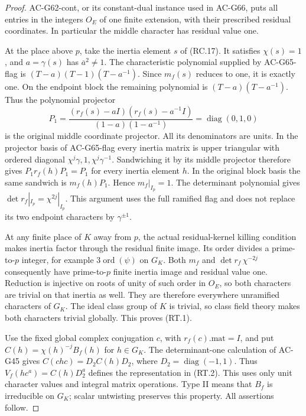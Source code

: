 \begin{proof}
AC-G62-cont, or its constant-dual instance used in AC-G66,
puts all entries in the integers \(O_E\) of one finite
extension, with their prescribed residual coordinates.
In particular the middle character has residual value one.

At the place above \(p\), take the inertia element \(s\)
of (RC.17). It satisfies \(\chi(s)=1\), and
\(a=\gamma(s)\) has \(\overline a^2\ne1\).
The characteristic polynomial supplied by AC-G65-flag is
\((T-a)(T-1)(T-a^{-1})\). Since \(m_f(s)\) reduces to
one, it is exactly one. On the endpoint block the remaining
polynomial is \((T-a)(T-a^{-1})\). Thus the polynomial
projector
\[
 P_1=\frac{(r_f(s)-aI)(r_f(s)-a^{-1}I)}
                 {(1-a)(1-a^{-1})}
             =\operatorname{diag}(0,1,0)
                                                        \tag{RT.3}
\]
is the original middle coordinate projector. All its
denominators are units. In the projector basis of
AC-G65-flag every inertia matrix is upper triangular with
ordered diagonal \(\chi^j\gamma,1,\chi^j\gamma^{-1}\).
Sandwiching it by its middle projector therefore gives
\(P_1r_f(h)P_1=P_1\) for every inertia element \(h\).
In the original block basis the same sandwich is
\(m_f(h)P_1\). Hence \(m_f|_{I_p}=1\).
The determinant polynomial gives
\(\det r_f|_{I_p}=\chi^{2j}|_{I_p}\).
This argument uses the full ramified flag and does not
replace its two endpoint characters by \(\gamma^{\pm1}\).

At any finite place of \(K\) away from \(p\), the actual
residual-kernel killing condition makes inertia factor
through the residual finite image. Its order divides a
prime-to-\(p\) integer, for example
\(3\operatorname{ord}(\psi)\) on \(G_K\).
Both \(m_f\) and \(\det r_f\,\chi^{-2j}\) consequently
have prime-to-\(p\) finite inertia image and residual
value one. Reduction is injective on roots of unity of
such order in \(O_E\), so both characters are trivial
on that inertia as well. They are therefore everywhere
unramified characters of \(G_K\). The ideal class group
of \(K\) is trivial, so class field theory makes both
characters trivial globally. This proves (RT.1).

Use the fixed global complex conjugation \(c\), with
\(r_f(c).\mathrm{mat}=I\), and put
\(C(h)=\chi(h)^{-j}B_f(h)\) for \(h\in G_K\).
The determinant-one calculation of AC-G45 gives
\(C(chc)=D_2C(h)D_2\), where
\(D_2=\operatorname{diag}(-1,1)\). Thus
\(V_f(hc^a)=C(h)D_2^a\) defines the representation
in (RT.2). This uses only unit character values and
integral matrix operations. Type II means that \(B_f\)
is irreducible on \(G_K\); scalar untwisting preserves
this property. All assertions follow.
\end{proof}


